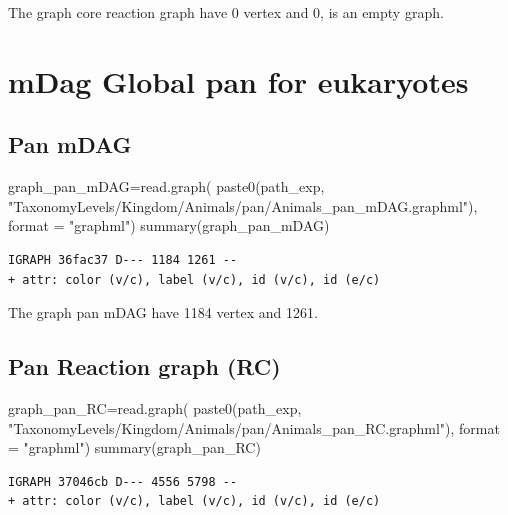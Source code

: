 \documentclass[
  letterpaper,
  DIV=11,
  numbers=noendperiod]{scrreprt}
\newenvironment{Shaded}{}{}
\newcommand{\AttributeTok}[1]{\textcolor[rgb]{0.78,0.47,0.87}{#1}}
\newcommand{\FunctionTok}[1]{\textcolor[rgb]{0.38,0.69,0.94}{#1}}
\newcommand{\NormalTok}[1]{\textcolor[rgb]{0.67,0.70,0.75}{#1}}
\newcommand{\OtherTok}[1]{\textcolor[rgb]{0.15,0.68,0.38}{#1}}
\newcommand{\StringTok}[1]{\textcolor[rgb]{0.60,0.76,0.47}{#1}}
\begin{document}
The graph core reaction graph have 0 vertex and 0, is an empty graph.

\hypertarget{mdag-global-pan-for-eukaryotes}{%
\section{mDag Global pan for
eukaryotes}\label{mdag-global-pan-for-eukaryotes}}

\hypertarget{pan-mdag}{%
\subsection{Pan mDAG}\label{pan-mdag}}

\begin{Shaded}
\begin{Highlighting}[]
\NormalTok{graph\_pan\_mDAG}\OtherTok{=}\FunctionTok{read.graph}\NormalTok{(}
  \FunctionTok{paste0}\NormalTok{(path\_exp,}
         \StringTok{"TaxonomyLevels/Kingdom/Animals/pan/Animals\_pan\_mDAG.graphml"}\NormalTok{),}
  \AttributeTok{format =} \StringTok{"graphml"}\NormalTok{)}
\FunctionTok{summary}\NormalTok{(graph\_pan\_mDAG)}
\end{Highlighting}
\end{Shaded}

\begin{verbatim}
IGRAPH 36fac37 D--- 1184 1261 -- 
+ attr: color (v/c), label (v/c), id (v/c), id (e/c)
\end{verbatim}

The graph pan mDAG have 1184 vertex and 1261.

\hypertarget{pan-reaction-graph-rc}{%
\subsection{Pan Reaction graph (RC)}\label{pan-reaction-graph-rc}}

\begin{Shaded}
\begin{Highlighting}[]
\NormalTok{graph\_pan\_RC}\OtherTok{=}\FunctionTok{read.graph}\NormalTok{(}
  \FunctionTok{paste0}\NormalTok{(path\_exp,}
         \StringTok{"TaxonomyLevels/Kingdom/Animals/pan/Animals\_pan\_RC.graphml"}\NormalTok{),}
  \AttributeTok{format =} \StringTok{"graphml"}\NormalTok{)}
\FunctionTok{summary}\NormalTok{(graph\_pan\_RC)}
\end{Highlighting}
\end{Shaded}

\begin{verbatim}
IGRAPH 37046cb D--- 4556 5798 -- 
+ attr: color (v/c), label (v/c), id (v/c), id (e/c)
\end{verbatim}
\end{document}
